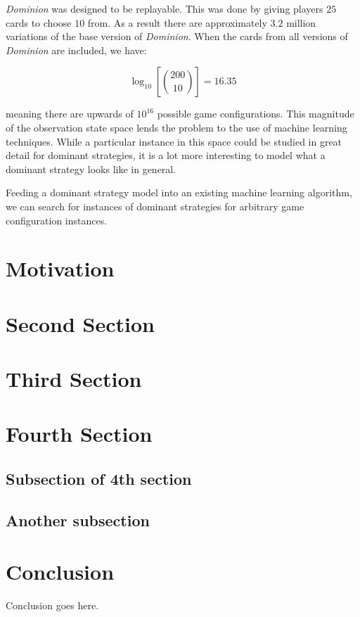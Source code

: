 \documentclass{acm_proc_article-sp}
\begin{document}
\emph{Dominion} was designed to be replayable. This was done by giving players
$25$ cards to choose $10$ from. As a result there are approximately $3.2$
million variations of the base version of \emph{Dominion}. When the cards from
all versions of \emph{Dominion} are included, we have:

$$\log_{10}{\left[\binom{200}{10}\right]} = 16.35$$

meaning there are upwards of $10^{16}$ possible game configurations. This
magnitude of the observation state space lends the problem to the use
of machine learning techniques. While a particular instance in this space
could be studied in great detail for dominant strategies, it is a lot more
interesting to model what a dominant strategy looks like in general.

Feeding a dominant strategy model into an existing machine learning algorithm,
we can search for instances of dominant strategies for arbitrary game
configuration instances.

\section{Motivation}

\section{Second Section}

\section{Third Section}

\section{Fourth Section}

\subsection{Subsection of 4th section}
\subsection{Another subsection}

\section{Conclusion}
Conclusion goes here.

\begin{biblist}
\end{biblist}

\balancecolumns
\end{document}
